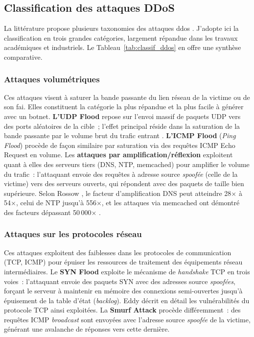 \subsection{Classification des attaques DDoS}
\label{subsec:classif_ddos}

La littérature propose plusieurs taxonomies des attaques \gls{ddos} \parencite{mirkovic2004taxonomy, zargar2013survey}. J'adopte ici la classification en trois grandes catégories, largement répandue dans les travaux académiques et industriels. Le Tableau~\ref{tab:classif_ddos} en offre une synthèse comparative.

\subsubsection{Attaques volumétriques}

Ces attaques visent à saturer la bande passante du lien réseau de la victime ou de son \gls{fai}. Elles constituent la catégorie la plus répandue et la plus facile à générer avec un botnet. \textbf{L'UDP Flood} repose sur l'envoi massif de paquets UDP vers des ports aléatoires de la cible~; l'effet principal réside dans la saturation de la bande passante par le volume brut du trafic entrant \parencite{mirkovic2004taxonomy}. \textbf{L'ICMP Flood} (\textit{Ping Flood}) procède de façon similaire par saturation via des requêtes ICMP Echo Request en volume. Les \textbf{attaques par amplification/réflexion} exploitent quant à elles des serveurs tiers (DNS, NTP, memcached) pour amplifier le volume du trafic~: l'attaquant envoie des requêtes à adresse source \textit{spoofée} (celle de la victime) vers des serveurs ouverts, qui répondent avec des paquets de taille bien supérieure. Selon Rossow \parencite{rossow2014amplification}, le facteur d'amplification DNS peut atteindre 28$\times$ à 54$\times$, celui de NTP jusqu'à 556$\times$, et les attaques via memcached ont démontré des facteurs dépassant 50\,000$\times$ \parencite{chua2018memcrashed}.

\subsubsection{Attaques sur les protocoles réseau}

Ces attaques exploitent des faiblesses dans les protocoles de communication (TCP, ICMP) pour épuiser les ressources de traitement des équipements réseau intermédiaires. Le \textbf{SYN Flood} exploite le mécanisme de \textit{handshake} TCP en trois voies~: l'attaquant envoie des paquets SYN avec des adresses source \textit{spoofées}, forçant le serveur à maintenir en mémoire des connexions semi-ouvertes jusqu'à épuisement de la table d'état (\textit{backlog}). Eddy \parencite{eddy2007syn} décrit en détail les vulnérabilités du protocole TCP ainsi exploitées. La \textbf{Smurf Attack} procède différemment~: des requêtes ICMP \textit{broadcast} sont envoyées avec l'adresse source \textit{spoofée} de la victime, générant une avalanche de réponses vers cette dernière.

